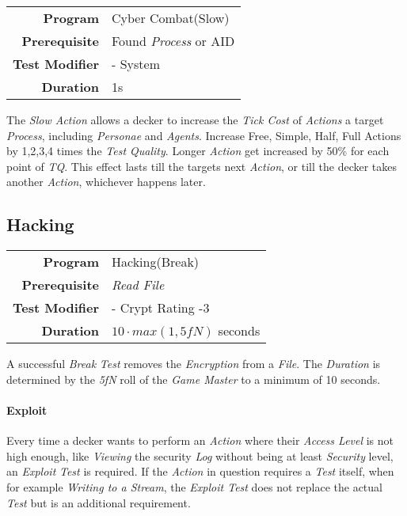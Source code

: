 \begin{tabular}{rl}
    \textbf{Program}       & Cyber Combat(Slow)          \\
    \textbf{Prerequisite}  & Found \emph{Process} or AID \\
    \textbf{Test Modifier} & - System                    \\
    \textbf{Duration}      & 1s                          \\
\end{tabular}

\hfill

The \emph{Slow Action} allows a decker to increase the \emph{Tick Cost} of
\emph{Actions} a target \emph{Process}, including \emph{Personae} and \emph{Agents}.
Increase Free, Simple, Half, Full Actions by 1,2,3,4 times the \emph{Test Quality}.
Longer \emph{Action} get increased by 50\% for each point of \emph{TQ}.
This effect lasts till the targets next \emph{Action}, or till the decker takes
another \emph{Action}, whichever happens later.

\subsection{Hacking}

\label{par:break}

\begin{tabular}{rl}
    \textbf{Program}       & Hacking(Break)                                   \\
    \textbf{Prerequisite}  & \emph{Read File}                                 \\
    \textbf{Test Modifier} & - Crypt Rating -3                                \\
    \textbf{Duration}      & $10 \cdot \textit{max}(1, \textit{5fN})$ seconds \\
\end{tabular}

\hfill

A successful \emph{Break} \emph{Test} removes the \emph{Encryption} from a
\emph{File}. The \emph{Duration} is determined by the \emph{5fN} roll of the
\emph{Game Master} to a minimum of 10 seconds.

\paragraph{Exploit}

Every time a decker wants to perform an \emph{Action} where their \emph{Access Level}
is not high enough, like \emph{Viewing} the security \emph{Log} without being
at least \emph{Security} level, an \emph{Exploit} \emph{Test} is required.
If the \emph{Action} in question requires a \emph{Test} itself,
when for example \emph{Writing to a Stream}, the \emph{Exploit Test} does not
replace the actual \emph{Test} but is an additional requirement.

